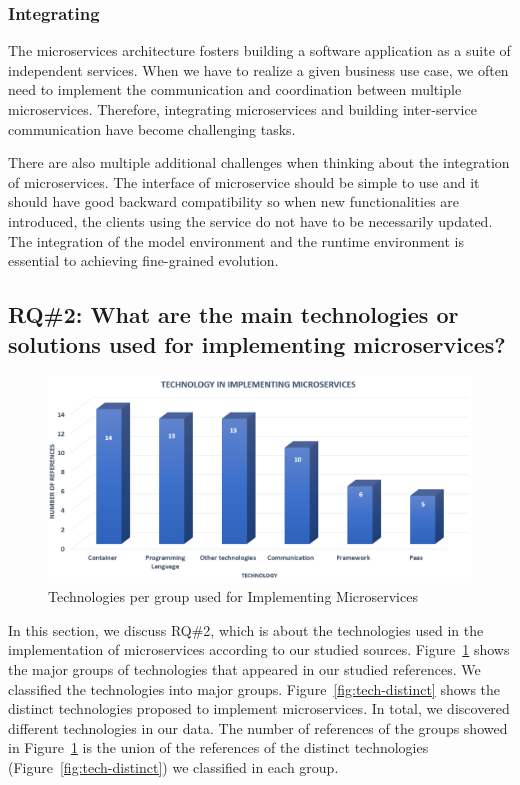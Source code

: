 \subsubsection{Integrating}%

The microservices architecture fosters building a software application as a suite of independent services.\cite{rosa2018} When we have to realize a given business use case, we often need to implement the communication and coordination between multiple microservices. Therefore, integrating microservices and building inter-service communication have become challenging tasks.

There are also multiple additional challenges when thinking about the integration of microservices. The interface of microservice should be simple to use and it should have good backward compatibility so when new functionalities are introduced, the clients using the service do not have to be necessarily updated.\cite{Kalske2017paper, Zhang2019, liu2018} The integration of the model environment and the runtime environment is essential to achieving fine-grained evolution.\cite{overeem2018}




\subsection{RQ\#2: What are the main technologies or solutions used for implementing microservices?}\label{sec:results-rq2}

\begin{figure}[h]
	\centering
	\includegraphics[width=0.65\linewidth]{images/commtechother.png}
	\caption{Technologies per group used for Implementing Microservices}
	\label{fig:tech-group}
\end{figure}	

In this section, we discuss RQ\#2, which is about the technologies used in the implementation of microservices according to our studied sources. Figure~\ref{fig:tech-group} shows the major groups of technologies that appeared in our studied references. We classified the technologies into \techgroupcount major groups.
Figure~\ref{fig:tech-distinct} shows the distinct technologies proposed to implement microservices. In total, we discovered \techcount different technologies in our data. 
The number of references of the groups showed in Figure~\ref{fig:tech-group} is the union of the references of the distinct technologies (Figure~\ref{fig:tech-distinct}) we classified in each group.  

